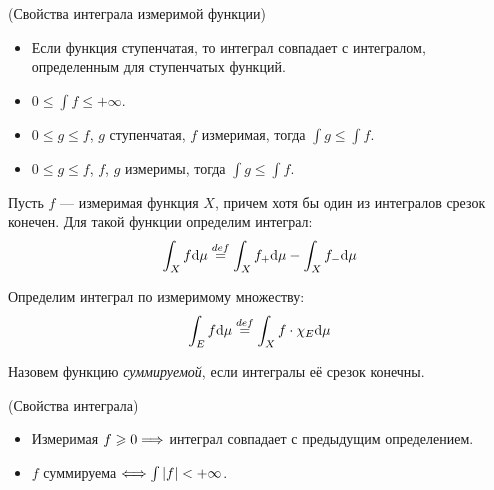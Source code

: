 \begin{theorem}(Свойства интеграла измеримой функции)
	\enewline

	\begin{itemize}
		\item Если функция ступенчатая, то интеграл совпадает с интегралом, определенным
			для ступенчатых функций.
		\item $0 \leqslant \int{f} \leqslant +\infty$.
		\item $0 \leqslant g \leqslant f$, $g$ ступенчатая, $f$ измеримая, тогда
			$\int{g} \leqslant \int{f}$.
		\item $0 \leqslant g \leqslant f$, $f$, $g$ измеримы, тогда $\int{g} \leqslant \int{f}$.
	\end{itemize}
\end{theorem}

\begin{definition}
	Пусть $f$ --- измеримая функция $X$, причем хотя бы один из интегралов срезок конечен.
	Для такой функции определим интеграл:
\[
	\int_X{f \mathrm{d}\mu} \overset{def}{\underset{}{=}} \int_X{f_+ \mathrm{d}\mu} - \int_X{f_- \mathrm{d}\mu}
\]
\end{definition}

\begin{definition}
	Определим интеграл по измеримому множеству:
\[
	\int_E{f \mathrm{d}\mu} \overset{def}{\underset{}{=}} \int_X{f \cdot \chi_{E} \mathrm{d}\mu}
\]
\end{definition}

\begin{definition}
	Назовем функцию \textit{суммируемой}, если интегралы её срезок конечны.
\end{definition}

\begin{theorem}(Свойства интеграла)
	\enewline

	\begin{itemize}
		\item Измеримая $f \geqslant 0 \Longrightarrow$ интеграл совпадает с предыдущим определением.
		\item $f$ суммируема $\Longleftrightarrow \int{|f|} < +\infty$. 
	\end{itemize}
\end{theorem}
